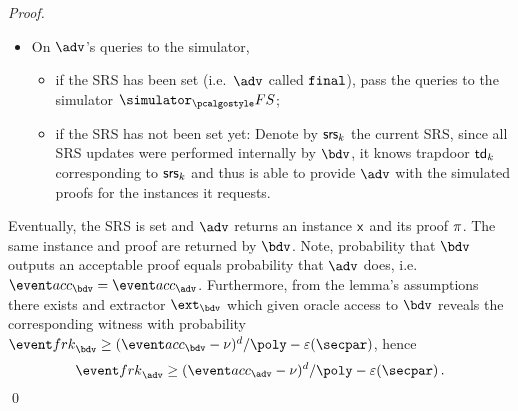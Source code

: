 \documentclass[runningheads,11pt]{llncs}
\begin{document}
\begin{proof}
\begin{itemize}
  \item On $\adv$'s queries to the simulator,
    \begin{itemize}
    \item if the SRS has been set (i.e.~$\adv$ called $\mathtt{final}$), pass the queries to the simulator $\simulator_\fs$;
    \item if the SRS has not been set yet: Denote by $\mathsf{srs}_k$ the current SRS,
      since all SRS updates were performed internally by $\bdv$, it knows
      trapdoor $\mathsf{td}_k$ corresponding to $\mathsf{srs}_k$ and thus is able to provide
      $\adv$ with the simulated proofs for the instances it requests.   
    \end{itemize}
  \end{itemize}

  Eventually, the SRS is set and $\adv$ returns an instance $\mathsf{x}$ and its proof
  $\pi$. The same instance and proof are returned by $\bdv$. Note,
  probability that $\bdv$ outputs an acceptable proof equals probability that
  $\adv$ does, i.e.~$\accProb_\bdv = \accProb_\adv$. Furthermore, from the lemma's
  assumptions there exists and extractor $\ext_\bdv$ which given oracle access
  to $\bdv$ reveals the corresponding witness with probability $\frkProb_\bdv
  \geq \infrac{(\accProb_\bdv - \nu)^d}{\poly} - \eps(\secpar)$, hence
  \[
    \frkProb_\adv \geq \infrac{(\accProb_\adv - \nu)^d}{\poly} - \eps(\secpar)\,.
  \]
  \qed
\end{proof}
\end{document}

